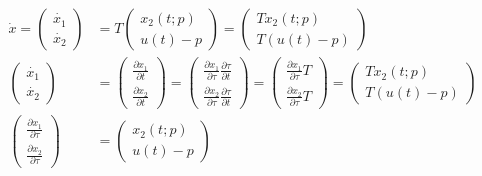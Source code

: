\documentclass  [
  paper    = a4,
  BCOR     = 10mm,
  twoside,
  fontsize = 12pt,
  fleqn,
  toc      = bibnumbered,
  toc      = listofnumbered,
  numbers  = noendperiod,
  headings = normal,
  listof   = leveldown,
  version  = 3.03
]                                       {scrreprt}
\newcommand{\<}{\langle}
\renewcommand{\>}{\rangle}
\begin{document}
\begin{subequations}
	\begin{align}
		\dot{x} =  \begin{pmatrix} \dot{x_1} \\ \dot{x_2} \end{pmatrix}  & =  T  \begin{pmatrix}  x_2(t;p) \\ u(t)-p   \end{pmatrix} = \begin{pmatrix}  Tx_2(t;p) \\ T(u(t)-p)   \end{pmatrix} \label{eq_difT} \\ 
		\begin{pmatrix} \dot{x_1} \\ \dot{x_2} \end{pmatrix} &= \begin{pmatrix} \frac{\partial x_1}{\partial t} \\ \frac{\partial x_2}{\partial t} \end{pmatrix} = \begin{pmatrix} \frac{\partial x_1}{\partial \tau} \frac{\partial \tau}{\partial t} \\ \frac{\partial x_2}{\partial \tau} \frac{\partial \tau}{\partial t} \end{pmatrix} =  \begin{pmatrix} \frac{\partial x_1}{\partial \tau} T \\ \frac{\partial x_2}{\partial \tau}T \end{pmatrix} =     \begin{pmatrix}  Tx_2(t;p) \\ T(u(t)-p)   \end{pmatrix} \\
		\begin{pmatrix} \frac{\partial x_1}{\partial \tau}  \\ \frac{\partial x_2}{\partial \tau} \end{pmatrix} & =     \begin{pmatrix}  x_2(t;p) \\ u(t)-p   \end{pmatrix} \label{eq_difTau}
	\end{align}
	\label{partialX}
\end{subequations}
\end{document}
